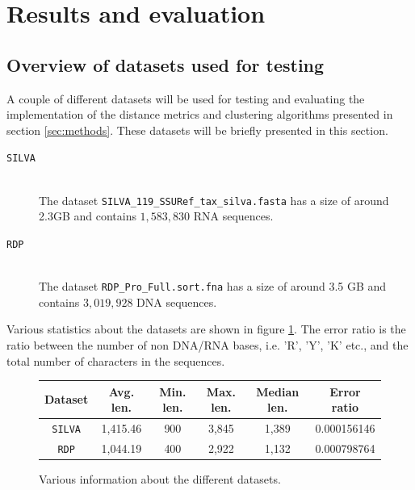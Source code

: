 \section{Results and evaluation} \label{sec:results}

\subsection{Overview of datasets used for testing}

A couple of different datasets will be used for testing and evaluating the
implementation of the distance metrics and clustering algorithms presented in
section \ref{sec:methods}. These datasets will be briefly presented in this
section.

\begin{description}
  \item[\texttt{SILVA}] \hfill \\
    The dataset \texttt{SILVA\_119\_SSURef\_tax\_silva.fasta} has a size of
    around 2.3GB and contains $1,583,830$ RNA sequences.

  \item[\texttt{RDP}] \hfill \\
    The dataset \texttt{RDP\_Pro\_Full.sort.fna} has a size of around 3.5 GB
    and contains $3,019,928$ DNA sequences.
\end{description}

Various statistics about the datasets are shown in figure \ref{fig:data_stats}.
The error ratio is the ratio between the number of non DNA/RNA bases, i.e. 'R',
'Y', 'K' etc., and the total number of characters in the sequences.

\begin{figure}[H]
  \centering
  \begin{tabular}{c |  c | c | c | c | c}
    Dataset        & Avg. len. & Min. len. & Max. len. & Median len. & Error ratio \\
    \hline
    \texttt{SILVA} & 1,415.46  & 900       & 3,845     & 1,389       & 0.000156146 \\
    \texttt{RDP}   & 1,044.19  & 400       & 2,922     & 1,132       & 0.000798764 \\
  \end{tabular}
  \caption{Various information about the different datasets.}
  \label{fig:data_stats}
\end{figure}


